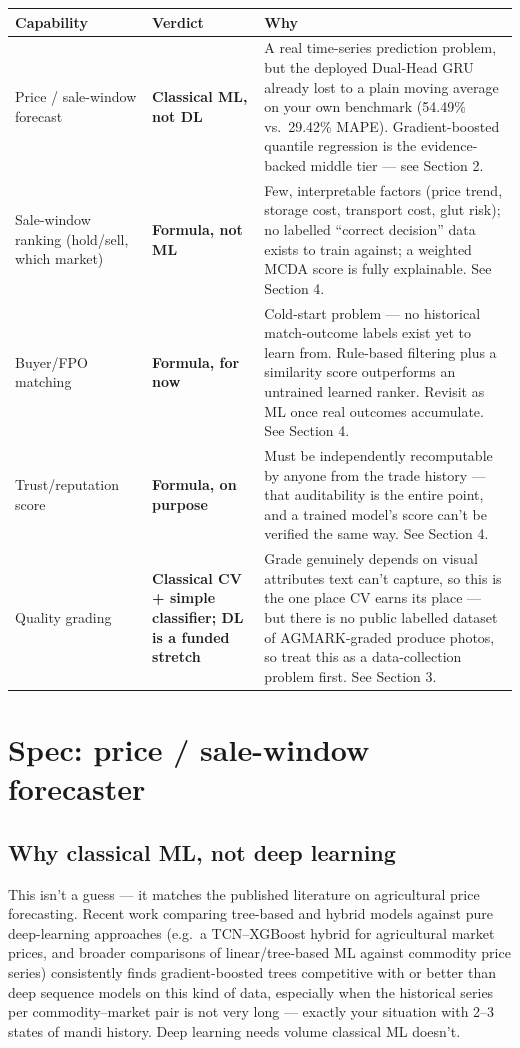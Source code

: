 \documentclass[11pt]{article}
\begin{document}
\renewcommand{\arraystretch}{1.35}
\noindent\begin{longtable}{@{}p{3.6cm}p{2.6cm}p{8.3cm}@{}}
\toprule
\textbf{Capability} & \textbf{Verdict} & \textbf{Why} \\
\midrule
\endhead
Price / sale-window forecast & \textbf{Classical ML, not DL} & A real time-series prediction problem, but
the deployed Dual-Head GRU already lost to a plain moving average on your own benchmark (54.49\% vs.\
29.42\% MAPE). Gradient-boosted quantile regression is the evidence-backed middle tier --- see Section 2. \\[0.4em]
Sale-window ranking (hold/sell, which market) & \textbf{Formula, not ML} & Few, interpretable factors
(price trend, storage cost, transport cost, glut risk); no labelled ``correct decision'' data exists to
train against; a weighted MCDA score is fully explainable. See Section 4. \\[0.4em]
Buyer/FPO matching & \textbf{Formula, for now} & Cold-start problem --- no historical match-outcome
labels exist yet to learn from. Rule-based filtering plus a similarity score outperforms an untrained
learned ranker. Revisit as ML once real outcomes accumulate. See Section 4. \\[0.4em]
Trust/reputation score & \textbf{Formula, on purpose} & Must be independently recomputable by anyone from
the trade history --- that auditability is the entire point, and a trained model's score can't be verified
the same way. See Section 4. \\[0.4em]
Quality grading & \textbf{Classical CV + simple classifier; DL is a funded stretch} & Grade genuinely
depends on visual attributes text can't capture, so this is the one place CV earns its place --- but there
is no public labelled dataset of AGMARK-graded produce photos, so treat this as a data-collection problem
first. See Section 3. \\
\bottomrule
\end{longtable}

\clearpage
\section{Spec: price / sale-window forecaster}

\subsection*{Why classical ML, not deep learning}
This isn't a guess --- it matches the published literature on agricultural price forecasting. Recent work
comparing tree-based and hybrid models against pure deep-learning approaches (e.g.\ a TCN--XGBoost hybrid
for agricultural market prices, and broader comparisons of linear/tree-based ML against commodity price
series) consistently finds gradient-boosted trees competitive with or better than deep sequence models on
this kind of data, especially when the historical series per commodity--market pair is not very long ---
exactly your situation with 2--3 states of mandi history. Deep learning needs volume classical ML doesn't.
\end{document}
